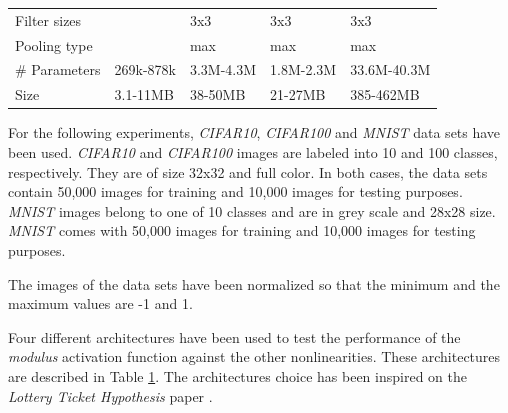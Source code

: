 \begin{table}[h]
\begin{tabular}[t]{lllll}
		Filter sizes &  & 3x3 & 3x3 & 3x3 \\
		Pooling type & & max & max & max \\
		\# Parameters        & 269k-878k       & 3.3M-4.3M   & 1.8M-2.3M                                            & 33.6M-40.3M                                                                             \\
		Size                 & 3.1-11MB & 38-50MB & 21-27MB & 385-462MB \\ \bottomrule
	\end{tabular}
	\label{tab:architectures}
	\vspace{20pt}
\end{table}

For the following experiments, \textit{CIFAR10}, \textit{CIFAR100} \autocite{krizhevsky09} and \textit{MNIST} \autocite{lecun2010} data sets have been used. \textit{CIFAR10} and \textit{CIFAR100} images are labeled into 10 and 100 classes, respectively. They are of size 32x32 and full color. In both cases, the data sets contain 50,000 images for training and 10,000 images for testing purposes. \textit{MNIST} images belong to one of 10 classes and are in grey scale and 28x28 size. \textit{MNIST} comes with 50,000 images for training and 10,000 images for testing purposes.

The images of the data sets have been normalized so that the minimum and the maximum values are -1 and 1. 

Four different architectures have been used to test the performance of the \textit{modulus} activation function against the other nonlinearities. These architectures are described in Table \ref{tab:architectures}. The architectures choice has been inspired on the \textit{Lottery Ticket Hypothesis} paper \autocite{frankleC19}.





